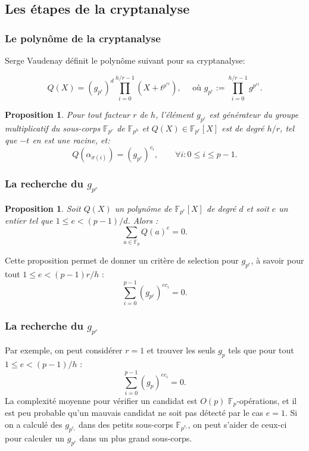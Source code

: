 \documentclass{beamer}
\newtheorem{prop}[theo]{Proposition}
\theoremstyle{definition}
\theoremstyle{remark}
\def\O{O}
\def\gf #1{\mathbb{F}_{#1}}
\begin{document}
\subsection{Les étapes de la cryptanalyse}
\begin{frame}
	\frametitle{Le polynôme de la cryptanalyse}
        Serge Vaudenay définit le polynôme suivant pour sa cryptanalyse:

$$Q(X) = (g_{p^r})^{d} \prod_{i=0}^{h/r-1} \left(X+t^{p^{ri}}\right), \quad \text{ où } g_{p^r} := \prod_{i=0}^{h/r-1} g^{p^{ri}}.$$
        \begin{prop}
Pour tout facteur $r$ de $h$, l'élément $g_{p^r}$ est générateur du groupe multiplicatif du sous-corps $\gf{p^r}$ de $\gf{p^h}$ et $Q(X) \in \gf{p^r}[X]$ est de degré $h/r$, tel que $-t$ en est une racine, et:
$$Q\left(\alpha_{\sigma(i)}\right) = (g_{p^r})^{c_i},\qquad \forall i : 0\leqslant i \leqslant p-1.$$
\end{prop}
\end{frame}

\begin{frame}
  \frametitle{La recherche du $g_{p^r}$}
  \begin{prop}
Soit $Q(X)$ un polynôme de $\gf{p^r}[X]$ de degré $d$ et soit $e$ un entier tel que $1 \leqslant e < (p-1)/d$. Alors : $$\sum_{a \in \gf{p}} Q(a)^e = 0.$$
\end{prop}
Cette proposition permet de donner un critère de selection pour $g_{p^r}$, à savoir pour tout $1 \leqslant e < (p-1)r/h$ :
$$\sum_{i=0}^{p-1} (g_{p^r})^{ec_i} = 0.$$
\end{frame}

\begin{frame}
  \frametitle{La recherche du $g_{p^r}$}
   Par exemple, on peut considérer $r=1$ et trouver les seuls $g_p$ tels que pour tout $1 \leqslant e < (p-1)/h$ :
   $$\sum_{i=0}^{p-1} (g_p)^{ec_i} = 0.$$
   La complexité moyenne pour vérifier un candidat est $\O(p)$ $\gf{p}$-opérations, et il est peu probable qu'un mauvais candidat ne soit pas détecté par le cas $e = 1$.
   Si on a calculé des $g_{p^{r_i}}$ dans des petits sous-corps $\gf{p^{r_i}}$, on peut s'aider de ceux-ci pour calculer un $g_{p^r}$ dans un plus grand sous-corps.
\end{frame}
\end{document}
